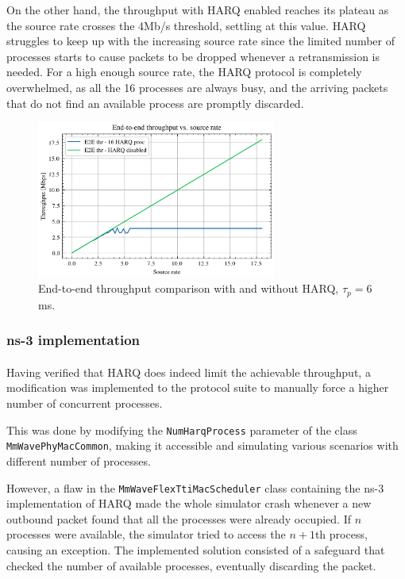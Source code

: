 On the other hand, the throughput with \ac{HARQ} enabled reaches its plateau as the source rate crosses the 4Mb/s threshold, settling at this value. \ac{HARQ} struggles to keep up with the increasing source rate since the limited number of processes starts to cause packets to be dropped whenever a retransmission is needed. For a high enough source rate, the \ac{HARQ} protocol is completely overwhelmed, as all the 16 processes are always busy, and the arriving packets that do not find an available process are promptly discarded.


\begin{figure}[ht]
    \centering
    \includegraphics[width=0.7\textwidth]{res/harq-onoff2.png}
    \caption{End-to-end throughput comparison with and without \ac{HARQ}, $\tau_p=6$ms.}
    \label{fig:harq_on_off}
\end{figure}
\subsubsection{ns-3 implementation}
\paragraph{}
Having verified that \ac{HARQ} does indeed limit the achievable throughput, a modification was implemented to the protocol suite to manually force a higher number of concurrent processes.

This was done by modifying the \texttt{NumHarqProcess} parameter of the class \texttt{MmWavePhyMacCommon}, making it accessible and simulating various scenarios with different number of processes.

However, a flaw in the \texttt{MmWaveFlexTtiMacScheduler} class containing the ns-3 implementation of \ac{HARQ} made the whole simulator crash whenever a new outbound packet found that all the processes were already occupied. If $n$ processes were available, the simulator tried to access the $n+1$th process, causing an exception. The implemented solution consisted of a safeguard that checked the number of available processes, eventually discarding the packet. 


